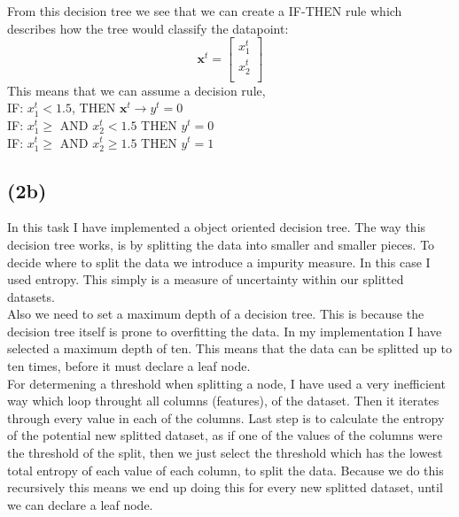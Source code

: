 \documentclass[12pt, letterpaper]{article}
\newcommand{\mbf}{\mathbf}
\begin{document}
      \noindent From this decision tree we see that we can create a IF-THEN rule which describes how the tree would classify the datapoint:
      \[
        \mbf{x}^t =
        \left[
          \begin{array}{ccc}
            x_1^t \\
            x_2^t \\
          \end{array}
        \right]
      \]
      This means that we can assume a decision rule,\\
      IF: $x_1^t < 1.5$, THEN $\mbf{x}^t \rightarrow y^t = 0$\\
      IF: $x_1^t \geq$ AND $x_2^t < 1.5$ THEN $y^t = 0$\\
      IF: $x_1^t \geq$ AND $x_2^t \geq 1.5$ THEN $y^t = 1$\\
    \subsection*{(2b)}
      In this task I have implemented a object oriented decision tree. The way this decision tree works, is by splitting the data into smaller and smaller pieces. To decide where to split the data we introduce a impurity measure. In this case I used entropy. This simply is a measure of uncertainty within our splitted datasets.\\

      Also we need to set a maximum depth of a decision tree. This is because the decision tree itself is prone to overfitting the data. In my implementation I have selected a maximum depth of ten. This means that the data can be splitted up to ten times, before it must declare a leaf node.\\

      For determening a threshold when splitting a node, I have used a very inefficient way which loop throught all columns (features), of the dataset. Then it iterates through every value in each of the columns. Last step is to calculate the entropy of the potential new splitted dataset, as if one of the values of the columns were the threshold of the split, then we just select the threshold which has the lowest total entropy of each value of each column, to split the data. Because we do this recursively this means we end up doing this for every new splitted dataset, until we can declare a leaf node.\\
\end{document}
